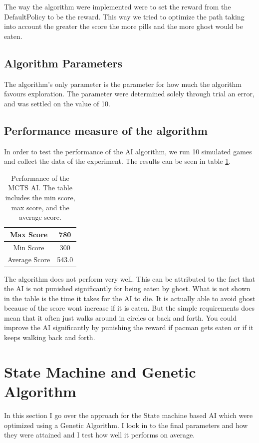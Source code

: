 \documentclass[conference,compsoc]{IEEEtran}
\begin{document}
The way the algorithm were implemented were to set the reward from the DefaultPolicy to be the reward. This way we tried to optimize the path taking into account the greater the score the more pills and the more ghost would be eaten.
\subsection{Algorithm Parameters}
The algorithm's only parameter is the parameter for how much the algorithm favours exploration. The parameter were determined solely through trial an error, and was settled on the value of 10. 
\subsection{Performance measure of the algorithm}
In order to test the performance of the AI algorithm, we run 10 simulated games and collect the data of the experiment. The results can be seen in table \ref{tab:MCTSPer}.
\begin{table}[h]
\begin{center}
\begin{tabular}{|c|c|}
\hline
Max Score & 780\\
\hline
Min Score & 300\\
\hline
Average Score & 543.0\\
\hline
\end{tabular}
\end{center}
\caption{Performance of the MCTS AI. The table includes the min score, max score, and the average score.}
\label{tab:MCTSPer}
\end{table}
The algorithm does not perform very well. This can be attributed to the fact that the AI is not punished significantly for being eaten by ghost. What is not shown in the table is the time it takes for the AI to die. It is actually able to avoid ghost because of the score wont increase if it is eaten. But the simple requirements does mean that it often just walks around in circles or back and forth. 
You could improve the AI significantly by punishing the reward if pacman gets eaten or if it keeps walking back and forth.
\section{State Machine and Genetic Algorithm}
In this section I go over the approach for the State machine based AI which were optimized using a Genetic Algorithm. I look in to the final parameters and how they were attained and I test how well it performs on average.
\end{document}
